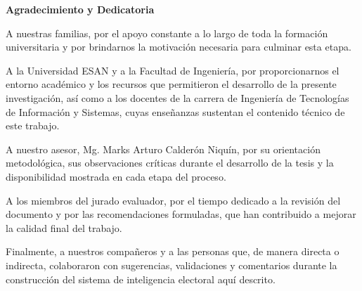 \begin{center}
	{\large \bfseries  Agradecimiento y Dedicatoria}
\end{center}
\vspace{0.5cm}

A nuestras familias, por el apoyo constante a lo largo de toda la formación universitaria y por brindarnos la motivación necesaria para culminar esta etapa.

A la Universidad ESAN y a la Facultad de Ingeniería, por proporcionarnos el entorno académico y los recursos que permitieron el desarrollo de la presente investigación, así como a los docentes de la carrera de Ingeniería de Tecnologías de Información y Sistemas, cuyas enseñanzas sustentan el contenido técnico de este trabajo.

A nuestro asesor, Mg. Marks Arturo Calderón Niquín, por su orientación metodológica, sus observaciones críticas durante el desarrollo de la tesis y la disponibilidad mostrada en cada etapa del proceso.

A los miembros del jurado evaluador, por el tiempo dedicado a la revisión del documento y por las recomendaciones formuladas, que han contribuido a mejorar la calidad final del trabajo.

Finalmente, a nuestros compañeros y a las personas que, de manera directa o indirecta, colaboraron con sugerencias, validaciones y comentarios durante la construcción del sistema de inteligencia electoral aquí descrito.

\newline

